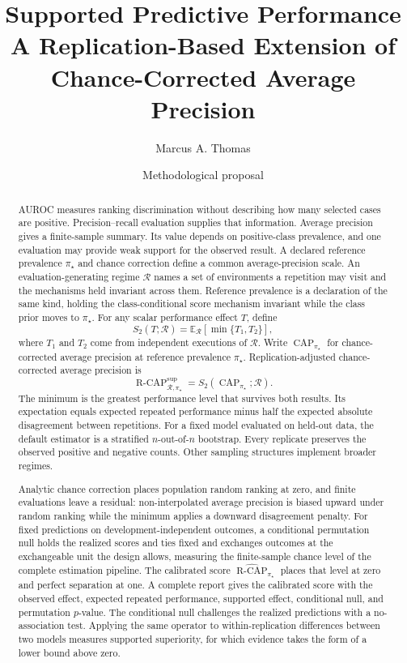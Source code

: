 \documentclass[11pt]{article}
\title{Supported Predictive Performance\\
\large A Replication-Based Extension of Chance-Corrected Average Precision}
\author{Marcus A. Thomas}
\date{Methodological proposal}
\newcommand{\CAP}{\operatorname{CAP}}
\newcommand{\Regime}{\mathcal{R}}
\newcommand{\E}{\mathbb{E}}
\newcommand{\RCAPfull}{\operatorname{R\text{-}CAP}^{\mathrm{sup}}_{\Regime,\pi_\star}}
\newcommand{\RCAPcalHat}{\widehat{\operatorname{R\text{-}CAP}}_{\pi_\star}}
\theoremstyle{remark}
\begin{document}
\maketitle

\begin{abstract}
AUROC measures ranking discrimination without describing how many selected cases are positive. Precision--recall evaluation supplies that information. Average precision gives a finite-sample summary. Its value depends on positive-class prevalence, and one evaluation may provide weak support for the observed result. A declared reference prevalence $\pi_\star$ and chance correction define a common average-precision scale. An evaluation-generating regime $\Regime$ names a set of environments a repetition may visit and the mechanisms held invariant across them. Reference prevalence is a declaration of the same kind, holding the class-conditional score mechanism invariant while the class prior moves to $\pi_\star$. For any scalar performance effect $T$, define
\[
S_2(T;\Regime)
=
\E_{\Regime}[\min\{T_1,T_2\}],
\]
where $T_1$ and $T_2$ come from independent executions of $\Regime$. Write $\CAP_{\pi_\star}$ for chance-corrected average precision at reference prevalence $\pi_\star$. Replication-adjusted chance-corrected average precision is
\[
\RCAPfull
=
S_2(\CAP_{\pi_\star};\Regime).
\]
The minimum is the greatest performance level that survives both results. Its expectation equals expected repeated performance minus half the expected absolute disagreement between repetitions. For a fixed model evaluated on held-out data, the default estimator is a stratified $n$-out-of-$n$ bootstrap. Every replicate preserves the observed positive and negative counts. Other sampling structures implement broader regimes.

Analytic chance correction places population random ranking at zero, and finite evaluations leave a residual: non-interpolated average precision is biased upward under random ranking while the minimum applies a downward disagreement penalty. For fixed predictions on development-independent outcomes, a conditional permutation null holds the realized scores and ties fixed and exchanges outcomes at the exchangeable unit the design allows, measuring the finite-sample chance level of the complete estimation pipeline. The calibrated score $\RCAPcalHat$ places that level at zero and perfect separation at one. A complete report gives the calibrated score with the observed effect, expected repeated performance, supported effect, conditional null, and permutation $p$-value. The conditional null challenges the realized predictions with a no-association test. Applying the same operator to within-replication differences between two models measures supported superiority, for which evidence takes the form of a lower bound above zero.
\end{abstract}
\end{document}
